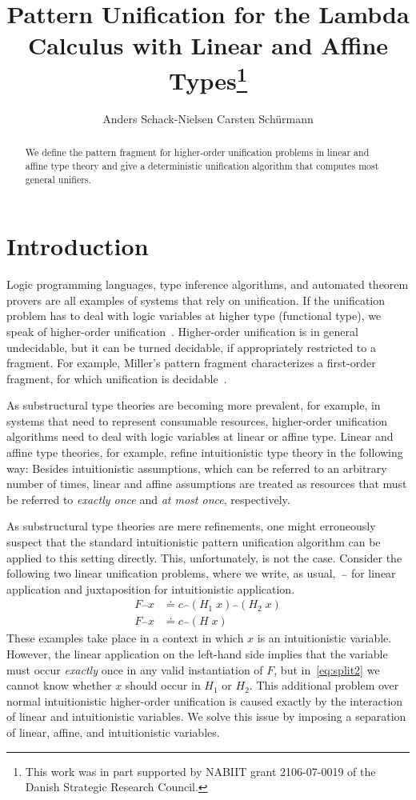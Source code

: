 \documentclass{eptcs}
\title{Pattern Unification for the Lambda Calculus with Linear and
Affine Types\thanks {\footnotesize This work was
   in part supported by NABIIT grant 2106-07-0019 of the Danish Strategic Research
   Council.}}
\author{Anders Schack-Nielsen
   \qquad\qquad
   Carsten Sch\"urmann
\institute{ 
  IT University of Copenhagen\\
  Copenhagen, Denmark \\
  \texttt{anderssn|carsten@itu.dk}}
  }
\newcommand{\lhat}[1]{\widehat{\;#1\;}}
\theoremstyle{definition}
\begin{document}
\maketitle
\begin{abstract}
  We define the pattern fragment for higher-order unification problems
  in linear and affine type theory and give a deterministic
  unification algorithm  that computes most general
  unifiers.
\end{abstract}


\section{Introduction}
Logic programming languages, type inference algorithms, and automated
theorem provers are all examples of systems that rely on unification.
If the unification problem has to deal with logic variables at higher
type (functional type), we speak of higher-order
unification~\cite{Huet75}.  Higher-order unification is in general
undecidable, but it can be turned decidable, if appropriately
restricted to a fragment.  For example, Miller's pattern fragment
characterizes a first-order fragment, for which unification is
decidable~\cite{Miller91jlc}. 

As substructural type theories are becoming more prevalent, for
example, in systems that need to represent consumable resources,
higher-order unification algorithms need to deal with logic variables
at linear or affine type.  Linear and affine type theories, for
example, refine intuitionistic type theory in the following way:
Besides intuitionistic assumptions, which can be referred to an
arbitrary number of times, linear and affine assumptions are treated
as resources that must be referred to \emph{exactly once} and \emph{at
  most once}, respectively.

As substructural type theories are mere refinements, one might erroneously suspect that the standard
intuitionistic pattern unification algorithm can be applied to this setting directly.
This, unfortunately, is not the case.  Consider the following two linear unification problems, where we write, as usual,~$\lhat{}$ for linear application and
juxtaposition for intuitionistic application.
\begin{align}
F\lhat{}x &\doteq c\lhat{}(H_1\;x)\lhat{}(H_2\;x) \label{eq:split2} \\
F\lhat{}x &\doteq c\lhat{}(H\;x) \label{eq:split1}
\end{align}
These examples take place in a context in which $x$ is an intuitionistic
variable.  However, the linear application on the left-hand side implies
that the variable must occur \emph{exactly} once in any valid
instantiation of $F$, but in~\eqref{eq:split2} we cannot know whether
$x$ should occur in $H_1$ or $H_2$.  This additional problem over normal
intuitionistic higher-order unification is caused exactly by the
interaction of linear and intuitionistic variables.
We solve this issue by imposing a separation of linear, affine, and
intuitionistic variables.
\end{document}
